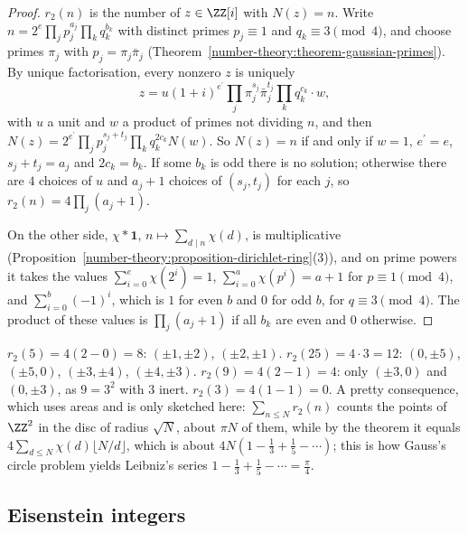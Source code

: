 \begin{proof}
$r_2(n)$ is the number of $z \in \ZZ[i]$ with $N(z) = n$. Write $n = 2^e\prod_jp_j^{a_j}\prod_kq_k^{b_k}$ with distinct primes $p_j \equiv 1$ and $q_k \equiv 3 \pmod 4$, and choose primes $\pi_j$ with
$p_j = \pi_j\bar\pi_j$ (Theorem~\ref{number-theory:theorem-gaussian-primes}). By unique factorisation, every nonzero $z$ is uniquely
\[
z = u(1 + i)^{e^{\prime}}\prod_j\pi_j^{s_j}\bar\pi_j^{t_j}\prod_kq_k^{c_k}\cdot w,
\]
with $u$ a unit and $w$ a product of primes not dividing $n$, and then $N(z) = 2^{e^{\prime}}\prod_jp_j^{s_j + t_j}\prod_kq_k^{2c_k}N(w)$. So $N(z) = n$ if and only if $w = 1$, $e^{\prime} = e$,
$s_j + t_j = a_j$ and $2c_k = b_k$. If some $b_k$ is odd there is no solution; otherwise there are $4$ choices of $u$ and $a_j + 1$ choices of $(s_j, t_j)$ for each $j$, so
$r_2(n) = 4\prod_j(a_j + 1)$.

On the other side, $\chi * \mathbf{1}$, $n \mapsto \sum_{d \mid n}\chi(d)$, is multiplicative (Proposition~\ref{number-theory:proposition-dirichlet-ring}(3)), and on prime powers it takes the values
$\sum_{i=0}^e\chi(2^i) = 1$, $\sum_{i=0}^a\chi(p^i) = a + 1$ for $p \equiv 1 \pmod 4$, and $\sum_{i=0}^b(-1)^i$, which is $1$ for even $b$ and $0$ for odd $b$, for $q \equiv 3 \pmod 4$. The product of these values is
$\prod_j(a_j + 1)$ if all $b_k$ are even and $0$ otherwise.
\end{proof}

\begin{example}\label{number-theory:example-jacobi}
$r_2(5) = 4(2 - 0) = 8$: $(\pm1, \pm2)$, $(\pm2, \pm1)$. $r_2(25) = 4 \cdot 3 = 12$: $(0, \pm5)$, $(\pm5, 0)$, $(\pm3, \pm4)$, $(\pm4, \pm3)$. $r_2(9) = 4(2 - 1) = 4$: only $(\pm3, 0)$ and $(0, \pm3)$, as
$9 = 3^2$ with $3$ inert. $r_2(3) = 4(1 - 1) = 0$. A pretty consequence, which uses areas and is only sketched here: $\sum_{n \leq N}r_2(n)$ counts the points of $\ZZ^2$ in the disc of radius $\sqrt N$, about
$\pi N$ of them, while by the theorem it equals $4\sum_{d \leq N}\chi(d)\lfloor N/d\rfloor$, which is about $4N(1 - \frac13 + \frac15 - \cdots)$; this is how Gauss's circle problem yields Leibniz's series
$1 - \frac13 + \frac15 - \cdots = \frac\pi4$.
\end{example}

\subsection{Eisenstein integers}\label{number-theory:subsection-eisenstein}

